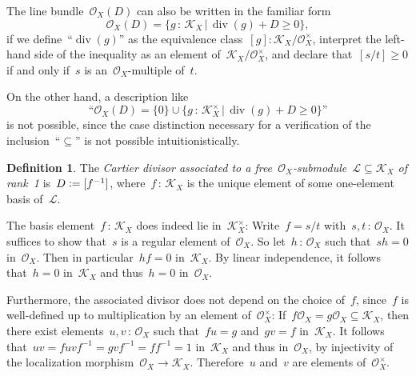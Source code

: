 \documentclass[10pt,reqno,a4paper]{amsbook}
\makeatletter
\theoremstyle{definition}
\newtheorem{defn}{Definition}[section]
\theoremstyle{plain}
\newtheorem{prop}[defn]{Proposition}
\theoremstyle{remark}
\renewcommand{\O}{\mathcal{O}}
\newcommand{\K}{\mathcal{K}}
\renewcommand{\L}{\mathcal{L}}
\newcommand{\?}{\,{:}\,}
\renewcommand{\_}{\mathpunct{.}\,}
\newcommand{\defeq}{\vcentcolon=}
\renewenvironment{proof}[1][\proofname]{\par
  \pushQED{\qed}%
  \normalfont \topsep6\p@\@plus6\p@\relax
  \trivlist
  \item[\hskip\labelsep
        \itshape
    #1\@addpunct{.}]\ignorespaces
}{%
  \popQED\endtrivlist\@endpefalse
}
\makeatother
\begin{document}
The line bundle~$\O_X(D)$ can also be written in the familiar form
\[ \O_X(D) = \{ g \? \K_X \,|\, \operatorname{div}(g) + D \geq 0 \}, \]
if we define~``$\operatorname{div}(g)$'' as the equivalence class~$[g] :
\K_X/\O_X^\times$, interpret the left-hand side of the inequality as an element
of~$\K_X/\O_X^\times$, and declare that~$[s/t] \geq 0$ if and only if~$s$ is
an~$\O_X$-multiple of~$t$.

On the other hand, a description like
\[ \text{``$\O_X(D) = \{ 0 \} \cup \{ g \? \K_X^\times \,|\,
  \operatorname{div}(g) + D \geq 0 \}$''} \]
is not possible, since the case distinction necessary for a verification of the
inclusion~``$\subseteq$'' is not possible intuitionistically.


\begin{defn}The \emph{Cartier divisor associated to a free~$\O_X$-submodule~$\L \subseteq
\K_X$ of rank~1} is~$D \defeq [f^{-1}]$, where~$f\?\K_X$ is the unique element of
some one-element basis of~$\L$.\end{defn}

The basis element~$f\?\K_X$ does indeed lie in~$\K_X^\times$: Write~$f
= s/t$ with~$s,t \? \O_X$. It suffices to show that~$s$ is a regular element
of~$\O_X$. So let~$h\?\O_X$ such that~$sh = 0$ in~$\O_X$. Then in
particular~$hf = 0$ in~$\K_X$. By linear independence, it follows that~$h = 0$
in~$\K_X$ and thus~$h = 0$ in~$\O_X$.

Furthermore, the associated divisor does not depend on the choice of~$f$,
since~$f$ is well-defined up to multiplication by an element of~$\O_X^\times$: If~$f
\O_X = g \O_X \subseteq \K_X$, then there exist elements~$u,v\?\O_X$ such that~$fu = g$
and~$gv = f$ in~$\K_X$. It follows that~$uv = fuvf^{-1} = gvf^{-1} = ff^{-1} =
1$ in~$\K_X$ and thus in~$\O_X$, by injectivity of the localization morphism~$\O_X \to
\K_X$. Therefore~$u$ and~$v$ are elements of~$\O_X^\times$.
\end{document}
